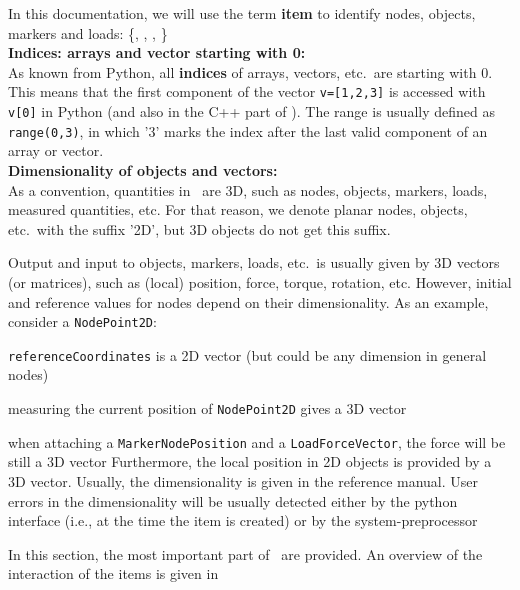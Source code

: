 In this documentation, we will use the term {\bf item} to identify nodes, objects, markers and loads:
\be
   \in \{, , ,  \}
\ee
\vspace{12pt}\\
{\bf Indices: arrays and vector starting with 0:} \vspace{6pt}\\
As known from Python, all {\bf indices} of arrays, vectors, etc.\ are starting with 0. This means that the first component of the vector \texttt{v=[1,2,3]} is accessed with \texttt{v[0]} in Python (and also in the C++ part of \codeName ). The range is usually defined as \texttt{range(0,3)}, in which '3' marks the index after the last valid component of an array or vector.
%
\vspace{12pt}\\
{\bf Dimensionality of objects and vectors:}\vspace{6pt}\\ 
As a convention, quantities in \codeName\ are 3D, such as nodes, objects, markers, loads, measured quantities, etc. 
For that reason, we denote planar nodes, objects, etc.\ with the suffix '2D', but 3D objects do not get this suffix.

Output and input to objects, markers, loads, etc.\ is usually given by 3D vectors (or matrices), such as (local) position, force, torque, rotation, etc. However, initial and reference values for nodes depend on their dimensionality.
As an example, consider a \texttt{NodePoint2D}:
\bi
  \item \texttt{referenceCoordinates} is a 2D vector (but could be any dimension in general nodes)
	\item measuring the current position of \texttt{NodePoint2D} gives a 3D vector
	\item when attaching a \texttt{MarkerNodePosition} and a \texttt{LoadForceVector}, the force will be still a 3D vector
\ei
Furthermore, the local position in 2D objects is provided by a 3D vector. Usually, the dimensionality is given in the reference manual. User errors in the dimensionality will be usually detected either by the python interface (i.e., at the time the item is created) or by the system-preprocessor

 \label{sec:items}
%
In this section, the most important part of \codeName\ are provided. An overview of the interaction of the items is given in 

